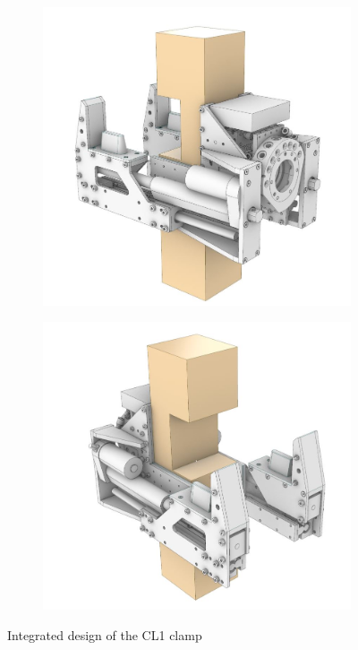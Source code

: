 \begin{figure}
    \centering
    \begin{subfigure}[b]{0.49\textwidth}
        \centering
        \includegraphics[width=\textwidth]{images/04-3/CL1_back.jpg}
    \end{subfigure}
    \hfill
    \begin{subfigure}[b]{0.49\textwidth}
        \centering
        \includegraphics[width=\textwidth]{images/04-3/CL1_front.jpg}
    \end{subfigure}
    \caption{Integrated design of the CL1 clamp} 
    \label{fig:integrated-cl1-hardware}
\end{figure}

